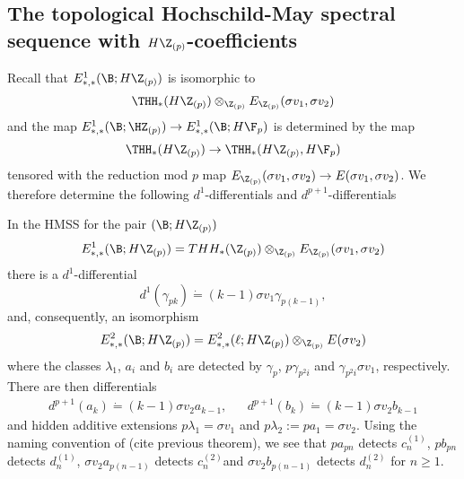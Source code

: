 \subsection{The topological Hochschild-May spectral sequence with $H\Z_{(p)}$-coefficients}
Recall that $E^1_{*,*}(\B;H\Z_{(p)})$ is isomorphic to 
\[ \THH_*(H\Z_{(p)})\otimes_{\Z_{(p)}}E_{\Z_{(p)}}(\sigma v_1,\sigma v_2)\]
and the map $E^1_{*,*}(\B;\HZ_{(p)})\to E^1_{*,*}(\B;H\F_p)$ is determined by the map 
\[ \THH_*(H\Z_{(p)})\to \THH_*(H\Z_{(p)},H\F_p)\]
tensored with the reduction mod $p$ map $E_{\Z_{(p)}}(\sigma v_1,\sigma v_2)\to E(\sigma v_1,\sigma v_2)$. We therefore determine the following $d^1$-differentials and $d^{p+1}$-differentials
\begin{lem}
In the HMSS for the pair $(\B;H\Z_{(p)})$
	\[
	E^1_{*,*}(\B;H\Z_{(p)})=THH_*(\Z_{(p)})\otimes_{\Z_{(p)}}E_{\Z_{(p)}}(\sigma v_1,\sigma v_2)
	\]
	there is a $d^1$-differential 
	\[
	d^1(\gamma_{pk}) \dot{=} (k-1)\sigma v_1\gamma_{p(k-1)},
	\]
	and, consequently, an isomorphism 
	\[E^2_{*,*}(\B;H\Z_{(p)})=E^2_{*,*}(\ell;H\Z_{(p)})\otimes_{\Z_{(p)}}E(\sigma v_2)\]
	where the classes $\lambda_1$, $a_i$ and $b_i$ are detected by $\gamma_p$, $p\gamma_{p^2i}$ and $\gamma_{p^2i}\sigma v_1$, respectively. There are then differentials
	\begin{align*}
	d^{p+1}(a_k) \dot{=} (k-1)\sigma v_2a_{k-1}, && d^{p+1}(b_k)\dot{=} (k-1)\sigma v_2 b_{k-1}
	\end{align*}
	and hidden additive extensions $p\lambda_1=\sigma v_1$ and $p\lambda_2:=pa_1=\sigma v_2$. Using the naming convention of (cite previous theorem), we see that $pa_{pn}$ detects $c_n^{(1)}$, $pb_{pn}$ detects $d_n^{(1)}$, $\sigma v_2a_{p(n-1)}$ detects $c_n^{(2)} $and $\sigma v_2b_{p(n-1)}$ detects $d_n^{(2)}$ for $n\ge 1$.
\end{lem}
